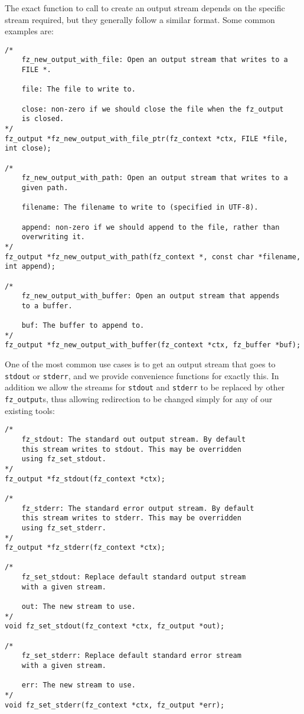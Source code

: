 \documentclass[oneside]{book}
\begin{document}
The exact function to call to create an output stream depends on the specific stream required, but they generally follow a similar format. Some common examples are:

\begin{lstlisting}
/*
	fz_new_output_with_file: Open an output stream that writes to a
	FILE *.

	file: The file to write to.

	close: non-zero if we should close the file when the fz_output
	is closed.
*/
fz_output *fz_new_output_with_file_ptr(fz_context *ctx, FILE *file, int close);

/*
	fz_new_output_with_path: Open an output stream that writes to a
	given path.

	filename: The filename to write to (specified in UTF-8).

	append: non-zero if we should append to the file, rather than
	overwriting it.
*/
fz_output *fz_new_output_with_path(fz_context *, const char *filename, int append);

/*
	fz_new_output_with_buffer: Open an output stream that appends
	to a buffer.

	buf: The buffer to append to.
*/
fz_output *fz_new_output_with_buffer(fz_context *ctx, fz_buffer *buf);
\end{lstlisting}

One of the most common use cases is to get an output stream that goes to \texttt{stdout} or \texttt{stderr}, and we provide convenience functions for exactly this. In addition we allow the streams for \texttt{stdout} and \texttt{stderr} to be replaced by other \texttt{fz\_output}s, thus allowing redirection to be changed simply for any of our existing tools:

\begin{lstlisting}
/*
	fz_stdout: The standard out output stream. By default
	this stream writes to stdout. This may be overridden
	using fz_set_stdout.
*/
fz_output *fz_stdout(fz_context *ctx);

/*
	fz_stderr: The standard error output stream. By default
	this stream writes to stderr. This may be overridden
	using fz_set_stderr.
*/
fz_output *fz_stderr(fz_context *ctx);

/*
	fz_set_stdout: Replace default standard output stream
	with a given stream.

	out: The new stream to use.
*/
void fz_set_stdout(fz_context *ctx, fz_output *out);

/*
	fz_set_stderr: Replace default standard error stream
	with a given stream.

	err: The new stream to use.
*/
void fz_set_stderr(fz_context *ctx, fz_output *err);
\end{lstlisting}
\end{document}
